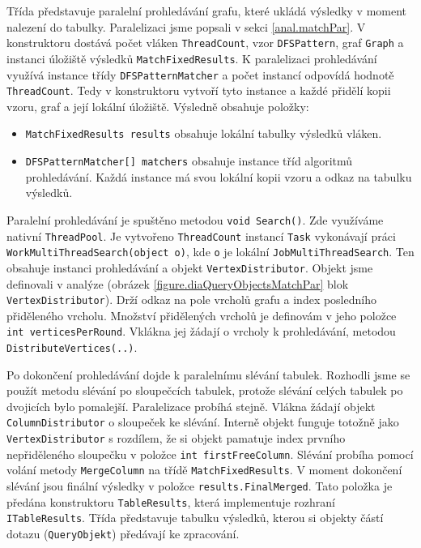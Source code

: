 Třída představuje paralelní prohledávání grafu, které ukládá výsledky v moment nalezení do tabulky.
Paralelizaci jsme popsali v sekci \ref{anal.matchPar}.
V konstruktoru dostává počet vláken \texttt{ThreadCount}, vzor \texttt{DFSPattern}, graf \texttt{Graph} a instanci úložiště výsledků \texttt{MatchFixedResults}.
K paralelizaci prohledávání využívá instance třídy \texttt{DFSPatternMatcher} a počet instancí odpovídá hodnotě \texttt{ThreadCount}.
Tedy v konstruktoru vytvoří tyto instance a každé přidělí kopii vzoru, graf a její lokální úložiště.
Výsledně obsahuje položky:
\begin{itemize}
\item \texttt{MatchFixedResults results} obsahuje lokální tabulky výsledků vláken.
\item \texttt{DFSPatternMatcher[] matchers} obsahuje instance tříd algoritmů prohledávání.
Každá instance má svou lokální kopii vzoru a odkaz na tabulku výsledků.
\end{itemize}
Paralelní prohledávání je spuštěno metodou \texttt{void Search()}.
Zde využíváme nativní \texttt{ThreadPool}.
Je vytvořeno \texttt{ThreadCount} instancí \texttt{Task} vykonávají práci \texttt{WorkMultiThreadSearch(object o)}, kde \texttt{o} je lokální \texttt{JobMultiThreadSearch}.
Ten obsahuje instanci prohledávání a objekt \texttt{VertexDistributor}.
Objekt jsme definovali v analýze (obrázek \ref{figure.diaQueryObjectsMatchPar} blok \texttt{VertexDistributor}).
Drží odkaz na pole vrcholů grafu a index posledního přiděleného vrcholu.
Množství přidělených vrcholů je definovám v jeho položce \texttt{int verticesPerRound}.
Vklákna jej žádají o vrcholy k prohledávání, metodou \texttt{DistributeVertices(..)}.

Po dokončení prohledávání dojde k paralelnímu slévání tabulek.
Rozhodli jsme se použít metodu slévání po sloupečcích tabulek, protože slévání celých tabulek po dvojicích bylo pomalejší.
Paralelizace probíhá stejně.
Vlákna žádají objekt \texttt{ColumnDistributor} o sloupeček ke slévání.
Interně objekt funguje totožně jako \texttt{VertexDistributor} s rozdílem, že si objekt pamatuje index prvního nepřiděleného sloupečku v položce \texttt{int firstFreeColumn}.
Slévání probíha pomocí volání metody \texttt{MergeColumn} na třídě \texttt{MatchFixedResults}.
V moment dokončení slévání jsou finální výsledky v položce \texttt{results.FinalMerged}.
Tato položka je předána konstruktoru \texttt{TableResults}, která implementuje rozhraní \texttt{ITableResults}.
Třída představuje tabulku výsledků, kterou si objekty částí dotazu (\texttt{QueryObjekt}) předávají ke zpracování.

